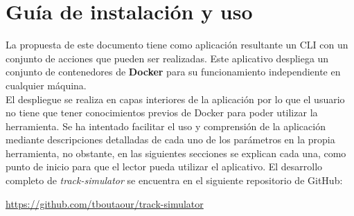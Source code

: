 
\chapter{Guía de instalación y uso} \label{chapter:GuiaUso}
La propuesta de este documento tiene como aplicación resultante un \ac{CLI} con un 
conjunto de acciones que pueden ser realizadas. Este aplicativo despliega un conjunto 
de contenedores de \textbf{Docker} para su funcionamiento independiente en 
cualquier máquina. 
\\
El despliegue se realiza en capas interiores de la aplicación por lo que el usuario no 
tiene que tener conocimientos previos de Docker para poder utilizar la herramienta. Se 
ha intentado facilitar el uso y comprensión de la aplicación mediante descripciones 
detalladas de cada uno de los parámetros en la propia herramienta, no obstante, en las 
siguientes secciones se explican cada una, como punto de inicio para que el lector 
pueda utilizar el aplicativo. El desarrollo completo de \textit{track-simulator} se 
encuentra en el siguiente repositorio de GitHub:

\faGithub \hspace{1em}  \url{https://github.com/tboutaour/track-simulator}

